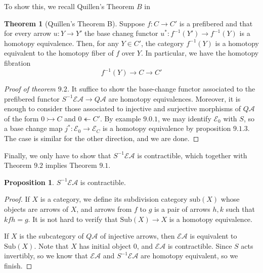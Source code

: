 \documentclass{article}
\theoremstyle{definition}
\newtheorem{theorem}{Theorem}[section]
\theoremstyle{definition}
\theoremstyle{definition}
\theoremstyle{definition}
\newtheorem{proposition}{Proposition}[theorem]
\theoremstyle{definition}
\theoremstyle{definition}
\theoremstyle{definition}
\begin{document}
To show this, we recall Quillen's Theorem $B$ in \cite{Quillen}


\begin{tcolorbox}[colback=red!5!white,colframe=red!30!white]
\begin{theorem}[Quillen's Theorem B]
Suppose $f: C\to C'$ is a prefibered and that for every arrow $u: Y\to Y'$ the base chaneg functor $u^*: f^{-1}(Y')\to f^{-1}(Y)$ is a homotopy equivalence. Then, for any $Y\in C'$, the category $f^{-1}(Y)$ is a homotopy equivalent to the homotopy fiber of $f$ over $Y$. In particular, we have the homotopy fibration
\[f^{-1}(Y)\to C\to C'\]
\end{theorem}
\end{tcolorbox}
\begin{proof}[Proof of theorem $9.2$]
    It suffice to show the base-change functor associated to the prefibered functor $S^{-1}\mathcal{E}\mathcal{A}\to Q \mathcal{A}$ are homotopy equivalences. Moreover, it is enough to consider those associated to injective and surjective morphisms of $Q \mathcal{A}$ of the form $0\rightarrowtail C$ and $0\twoheadleftarrow C'$. By example $9.0.1$, we may identify $\mathcal{E}_0$ with $S$, so a base change map $j^*: \mathcal{E}_0\to \mathcal{E}_C$ is a homotopy equivalence by proposition $9.1.3$. The case is similar for the other direction, and we are done.
\end{proof}

Finally, we only have to show that $S^{-1}\mathcal{E}\mathcal{A}$ is contractible, which together with Theorem $9.2$ implies Theorem $9.1$. 


\begin{tcolorbox}[colback=blue!5!white,colframe=blue!30!white]
\begin{proposition}
$S^{-1}\mathcal{E}\mathcal{A}$ is contractible.
\end{proposition}
\end{tcolorbox}
\begin{proof}
    If $X$ is a category, we define its subdivision category $\textrm{sub}(X)$ whose objects are arrows of $X$, and arrows from $f$ to  $g$ is a pair of arrows $h,k$ such that $kfh=g$. It is not hard to verify that $\textrm{Sub}(X)\to X$ is a homotopy equivalence. 

    If $X$ is the subcategory of $Q \mathcal{A}$ of injective arrows, then $\mathcal{E}\mathcal{A}$ is equivalent to $\textrm{Sub} (X)$. Note that $X$ has initial object $0$, and $\mathcal{E}\mathcal{A}$ is contractible. Since $S$ acts invertibly, so we know that $\mathcal{E} \mathcal{A}$ and $S^{-1}\mathcal{E} \mathcal{A}$ are homotopy equivalent, so we finish.
\end{proof}
\end{document}
